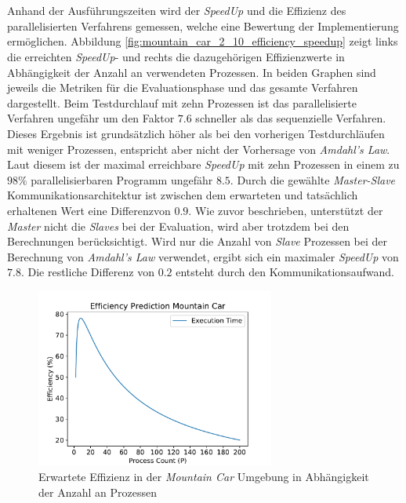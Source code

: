\\\\
Anhand der Ausführungszeiten wird der \emph{SpeedUp} und die Effizienz des parallelisierten Verfahrens gemessen, welche eine Bewertung der Implementierung ermöglichen. Abbildung \ref{fig:mountain_car_2_10_efficiency_speedup} zeigt links die erreichten \emph{SpeedUp}- und rechts die dazugehörigen Effizienzwerte in Abhängigkeit der Anzahl an verwendeten Prozessen. In beiden Graphen sind jeweils die Metriken für die Evaluationsphase und das gesamte Verfahren dargestellt. Beim Testdurchlauf mit zehn Prozessen ist das parallelisierte Verfahren ungefähr um den Faktor $7.6$ schneller als das sequenzielle Verfahren. Dieses Ergebnis ist grundsätzlich höher als bei den vorherigen Testdurchläufen mit weniger Prozessen, entspricht aber nicht der Vorhersage von \emph{Amdahl's Law}. Laut diesem ist der maximal erreichbare \emph{SpeedUp} mit zehn Prozessen in einem zu $98\%$ parallelisierbaren Programm ungefähr $8.5$. Durch die gewählte \emph{Master-Slave} Kommunikationsarchitektur ist zwischen dem erwarteten und tatsächlich erhaltenen Wert eine Differenzvon $0.9$. Wie zuvor beschrieben, unterstützt der \emph{Master} nicht die \emph{Slaves} bei der Evaluation, wird aber trotzdem bei den Berechnungen berücksichtigt. Wird nur die Anzahl von \emph{Slave} Prozessen bei der Berechnung von \emph{Amdahl's Law} verwendet, ergibt sich ein maximaler \emph{SpeedUp} von $7.8$. Die restliche Differenz von $0.2$ entsteht durch den Kommunikationsaufwand. 
\begin{figure}[!h]
	\centering
	\includegraphics[width=0.7\textwidth]{./img/mountain_car_analysis/mountain_car_efficiency_prediction.pdf} 
	\caption{Erwartete Effizienz in der \emph{Mountain Car} Umgebung in Abhängigkeit der Anzahl an Prozessen}
	\label{fig:mountain_car_efficiency_predidction}
\end{figure}
\\\\

